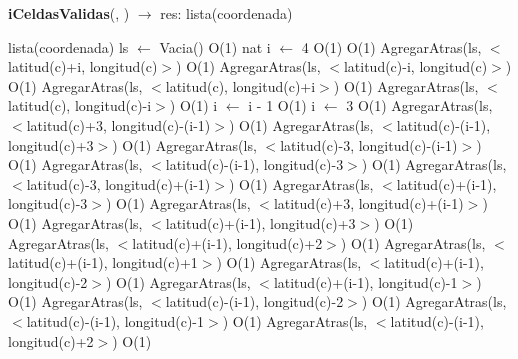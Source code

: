 \begin{Algoritmos}
\begin{algorithm}[H]{\textbf{iCeldasValidas}(, ) $\to$ res: lista(coordenada)}
	\begin{algorithmic}[1]
		\State lista(coordenada) ls $\gets$ Vacia() \Comment O(1)
		\State nat i $\gets$ 4 \Comment O(1)
		 \Comment O(1)
			\State AgregarAtras(ls, $<$latitud(c)+i, longitud(c)$>$) \Comment O(1)
				\State AgregarAtras(ls, $<$latitud(c)-i, longitud(c)$>$) \Comment O(1)
			\EndIf			
			\State AgregarAtras(ls, $<$latitud(c), longitud(c)+i$>$) \Comment O(1)
				\State AgregarAtras(ls, $<$latitud(c), longitud(c)-i$>$) \Comment O(1)
			\EndIf			
			\State i $\gets$ i - 1 \Comment O(1)
		\EndWhile
		\State i $\gets$ 3
		 \Comment O(1)
				\State AgregarAtras(ls, $<$latitud(c)+3, longitud(c)-(i-1)$>$) \Comment O(1)
			\EndIf
				\State AgregarAtras(ls, $<$latitud(c)-(i-1), longitud(c)+3$>$) \Comment O(1)
			\EndIf
				\State AgregarAtras(ls, $<$latitud(c)-3, longitud(c)-(i-1)$>$) \Comment O(1)
			\EndIf
				\State AgregarAtras(ls, $<$latitud(c)-(i-1), longitud(c)-3$>$) \Comment O(1)
			\EndIf
				\State AgregarAtras(ls, $<$latitud(c)-3, longitud(c)+(i-1)$>$) \Comment O(1)
			\EndIf
				\State AgregarAtras(ls, $<$latitud(c)+(i-1), longitud(c)-3$>$) \Comment O(1)
			\EndIf			
			\State AgregarAtras(ls, $<$latitud(c)+3, longitud(c)+(i-1)$>$) \Comment O(1)
			\State AgregarAtras(ls, $<$latitud(c)+(i-1), longitud(c)+3$>$) \Comment O(1)
			\State AgregarAtras(ls, $<$latitud(c)+(i-1), longitud(c)+2$>$) \Comment O(1)
			\State AgregarAtras(ls, $<$latitud(c)+(i-1), longitud(c)+1$>$) \Comment O(1)
				\State AgregarAtras(ls, $<$latitud(c)+(i-1), longitud(c)-2$>$) \Comment O(1)
			\EndIf
				\State AgregarAtras(ls, $<$latitud(c)+(i-1), longitud(c)-1$>$) \Comment O(1)
			\EndIf
				\State AgregarAtras(ls, $<$latitud(c)-(i-1), longitud(c)-2$>$) \Comment O(1)
			\EndIf
				\State AgregarAtras(ls, $<$latitud(c)-(i-1), longitud(c)-1$>$) \Comment O(1)
			\EndIf
				\State AgregarAtras(ls, $<$latitud(c)-(i-1), longitud(c)+2$>$) \Comment O(1)
			\EndIf			

\end{algorithmic}
\end{algorithm}
\end{Algoritmos}
